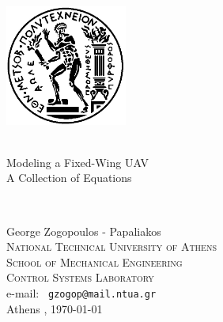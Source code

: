 \begin{titlingpage}
\begin{center}

\includegraphics[width=0.3\textwidth]{./figures/ntua_logo}~\\[1cm]

\HRule \\
\linespread{1.5}
\begin{huge}
Modeling a Fixed-Wing UAV\\
A Collection of Equations\\

\par
\end{huge}
\HRule \\

\vfill

{\Large
George Zogopoulos - Papaliakos
} \\[0.3cm]
\textsc{\large 
National Technical University of Athens
}\\
\textsc{School of Mechanical Engineering\\ Control Systems Laboratory} \\[0.3cm]
e-mail: \texttt{
gzogop@mail.ntua.gr
} \\[1cm]
{
Athens
, \today}

	

\end{center}

\end{titlingpage}